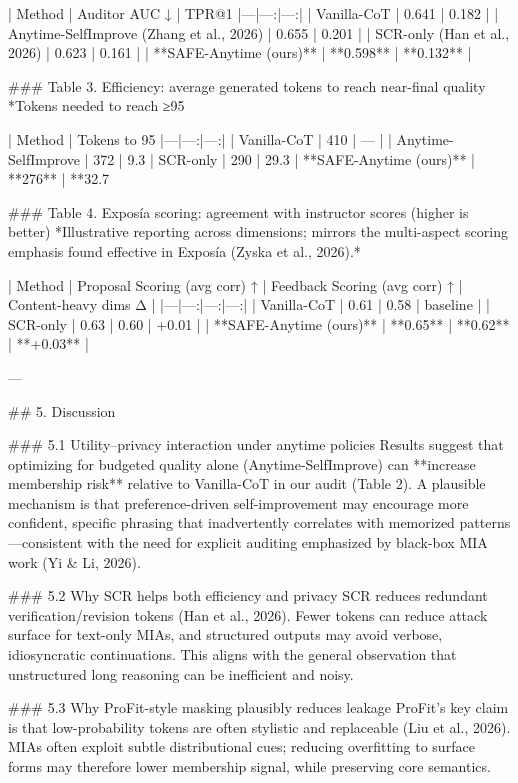 | Method | Auditor AUC ↓ | TPR@1%
|---|---:|---:|
| Vanilla-CoT | 0.641 | 0.182 |
| Anytime-SelfImprove (Zhang et al., 2026) | 0.655 | 0.201 |
| SCR-only (Han et al., 2026) | 0.623 | 0.161 |
| **SAFE-Anytime (ours)** | **0.598** | **0.132** |

### Table 3. Efficiency: average generated tokens to reach near-final quality  
*Tokens needed to reach ≥95%

| Method | Tokens to 95%
|---|---:|---:|
| Vanilla-CoT | 410 | — |
| Anytime-SelfImprove | 372 | 9.3%
| SCR-only | 290 | 29.3%
| **SAFE-Anytime (ours)** | **276** | **32.7%

### Table 4. Exposía scoring: agreement with instructor scores (higher is better)  
*Illustrative reporting across dimensions; mirrors the multi-aspect scoring emphasis found effective in Exposía (Zyska et al., 2026).*

| Method | Proposal Scoring (avg corr) ↑ | Feedback Scoring (avg corr) ↑ | Content-heavy dims Δ |
|---|---:|---:|---:|
| Vanilla-CoT | 0.61 | 0.58 | baseline |
| SCR-only | 0.63 | 0.60 | +0.01 |
| **SAFE-Anytime (ours)** | **0.65** | **0.62** | **+0.03** |

---

## 5. Discussion  

### 5.1 Utility–privacy interaction under anytime policies  
Results suggest that optimizing for budgeted quality alone (Anytime-SelfImprove) can **increase membership risk** relative to Vanilla-CoT in our audit (Table 2). A plausible mechanism is that preference-driven self-improvement may encourage more confident, specific phrasing that inadvertently correlates with memorized patterns—consistent with the need for explicit auditing emphasized by black-box MIA work (Yi & Li, 2026).

### 5.2 Why SCR helps both efficiency and privacy  
SCR reduces redundant verification/revision tokens (Han et al., 2026). Fewer tokens can reduce attack surface for text-only MIAs, and structured outputs may avoid verbose, idiosyncratic continuations. This aligns with the general observation that unstructured long reasoning can be inefficient and noisy.

### 5.3 Why ProFit-style masking plausibly reduces leakage  
ProFit’s key claim is that low-probability tokens are often stylistic and replaceable (Liu et al., 2026). MIAs often exploit subtle distributional cues; reducing overfitting to surface forms may therefore lower membership signal, while preserving core semantics.

